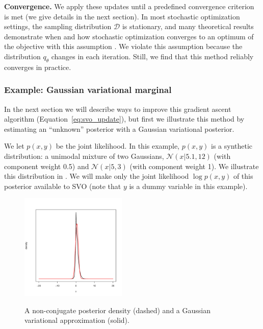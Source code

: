 \textbf{Convergence.} We apply these updates until a predefined
convergence criterion is met (we give details in the next section).
In most stochastic optimization settings, the sampling distribution
$\mathcal{D}$ is stationary, and many theoretical results demonstrate
when and how stochastic optimization converges to an optimum of the
objective with this assumption \citep{bottou:2004,robbins:1951}.  We
violate this assumption because the distribution $q_\theta$ changes in
each iteration.  Still, we find that this method reliably converges in
practice.

\subsubsection{Example: Gaussian variational marginal}
\label{sec:so_gaussian}
In the next section we will describe ways to improve this gradient
ascent algorithm (Equation~\ref{eq:svo_update}), but first we
illustrate this method by estimating an ``unknown'' posterior with a
Gaussian variational posterior.

We let $p(x, y)$ be the joint likelihood. In this example, $p(x, y)$
is a synthetic distribution: a unimodal mixture of two Gaussians,
$\mathcal{N}(x | 5.1, 12)$ (with component weight 0.5) and
$\mathcal{N}(x | 5, 3)$ (with component weight 1).  We illustrate this
distribution in
.  We will make
only the joint likelihood $\log p(x, y)$ of this posterior available
to SVO (note that $y$ is a dummy variable in this example).
\begin{figure}[t!]
  \center
  \vspace{-32pt}
  \includegraphics[width=0.45\textwidth,height=0.21\textheight]{chapter_stochastic_variational_optimization/figures/laplace_approximation.pdf} \\
  \vspace{-20pt}
  \caption{A non-conjugate posterior density (dashed) and a Gaussian
  variational approximation (solid).}
  \label{fig:univariate_comparison_approximation}
\end{figure}

